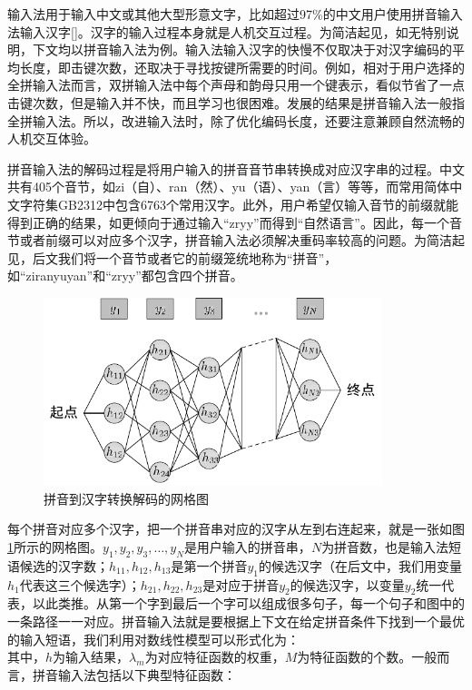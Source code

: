 输入法用于输入中文或其他大型形意文字，比如超过97\%的中文用户使用拼音输入法输入汉字[\cite{chen:1997}]。汉字的输入过程本身就是人机交互过程。为简洁起见，如无特别说明，下文均以拼音输入法为例。输入法输入汉字的快慢不仅取决于对汉字编码的平均长度，即击键次数，还取决于寻找按键所需要的时间。例如，相对于用户选择的全拼输入法而言，双拼输入法中每个声母和韵母只用一个键表示，看似节省了一点击键次数，但是输入并不快，而且学习也很困难。发展的结果是拼音输入法一般指全拼输入法。所以，改进输入法时，除了优化编码长度，还要注意兼顾自然流畅的人机交互体验。

拼音输入法的解码过程是将用户输入的拼音音节串转换成对应汉字串的过程。中文共有405个音节，如zi（自）、ran（然）、yu（语）、yan（言）等等，而常用简体中文字符集GB2312中包含6763个常用汉字。此外，用户希望仅输入音节的前缀就能得到正确的结果，如更倾向于通过输入“zryy”而得到“自然语言”。因此，每一个音节或者前缀可以对应多个汉字，拼音输入法必须解决重码率较高的问题。为简洁起见，后文我们将一个音节或者它的前缀笼统地称为“拼音”，如“ziranyuyan”和“zryy”都包含四个拼音。

\begin{figure}[!tb]
	\centering
	\includegraphics[width=0.88\textwidth]{Figure/Figure_3_1.pdf}
	\caption{拼音到汉字转换解码的网格图}
	\label{Fig_pinyin_to_character}
\end{figure}

每个拼音对应多个汉字，把一个拼音串对应的汉字从左到右连起来，就是一张如图\ref{Fig_pinyin_to_character}所示的网格图。$y_1,y_2,y_3,\ldots,y_N$是用户输入的拼音串，$N$为拼音数，也是输入法短语候选的汉字数；$h_{11},h_{12},h_{13}$是第一个拼音$y_1$的候选汉字（在后文中，我们用变量$h_1$代表这三个候选字）；$h_{21},h_{22},h_{23}$是对应于拼音$y_2$的候选汉字，以变量$y_2$统一代表，以此类推。从第一个字到最后一个字可以组成很多句子，每一个句子和图中的一条路径一一对应。拼音输入法就是要根据上下文在给定拼音条件下找到一个最优的输入短语，我们利用对数线性模型可以形式化为：
\begin{equation}
\label{input_method_linear}
\end{equation}
其中，$h$为输入结果，$\lambda_m$为对应特征函数的权重，$M$为特征函数的个数。一般而言，拼音输入法包括以下典型特征函数：

